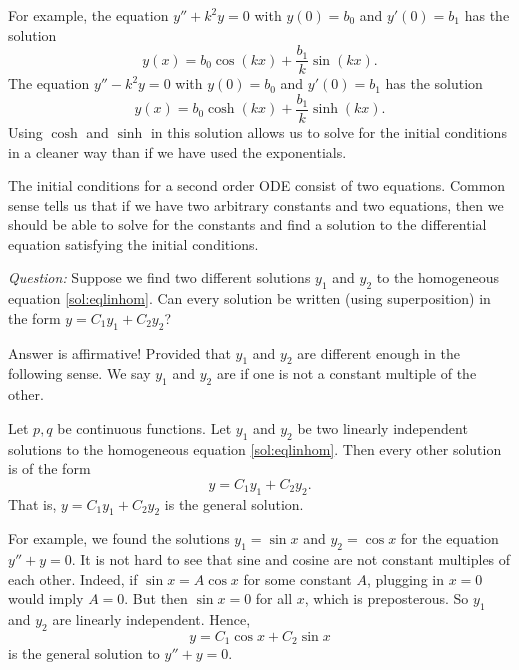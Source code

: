 For example, the equation $y'' + k^2 y = 0$ with $y(0) = b_0$ and $y'(0) = b_1$
has the solution
\begin{equation*}
y(x) = b_0 \cos (kx) + \frac{b_1}{k} \sin (kx) .
\end{equation*}
The equation $y'' - k^2 y = 0$ with $y(0) = b_0$ and $y'(0) = b_1$
has the solution
\begin{equation*}
y(x) = b_0 \cosh (kx) + \frac{b_1}{k} \sinh (kx) .
\end{equation*}
Using $\cosh$ and $\sinh$ in this solution allows us to solve for
the initial conditions
in a cleaner way
than if we have used the exponentials.

\medskip

The initial conditions for a second order ODE consist of two
equations.  Common sense tells us that
if we have two arbitrary constants and two equations, then we should 
be able to solve
for the constants and find a solution to the differential equation
satisfying the initial conditions.

\emph{Question:} Suppose we find two different solutions $y_1$ and $y_2$ to the
homogeneous equation \eqref{sol:eqlinhom}.  Can every solution
be written (using superposition) in the form
$y = C_1 y_1 + C_2 y_2$?

Answer is affirmative!  Provided that $y_1$ and $y_2$ are different enough in
the following sense.  We say $y_1$ and $y_2$ are \emph{} if one is not a constant multiple of the other.

\begin{theorem}
Let $p, q$ be continuous functions.
Let $y_1$ and $y_2$ be two linearly independent
solutions to the homogeneous equation \eqref{sol:eqlinhom}. 
Then every other solution is 
of the form
\begin{equation*}
y = C_1 y_1 + C_2 y_2 .
\end{equation*}
That is, $y = C_1 y_1 + C_2 y_2$ is the general solution.
\end{theorem}

For example, we found the solutions
$y_1 = \sin x$ and $y_2 = \cos x$ for the
equation $y'' + y = 0$.  It is not hard to see that sine and cosine are not
constant
multiples of each other.  Indeed, if $\sin x = A \cos x$ for some constant $A$,
plugging in $x=0$ would imply $A = 0$.  But then $\sin x = 0$ for all
$x$, which is preposterous.
So $y_1$ and $y_2$ are linearly independent.  Hence,
\begin{equation*}
y = C_1 \cos x + C_2 \sin x 
\end{equation*}
is the general solution to $y'' + y = 0$.

